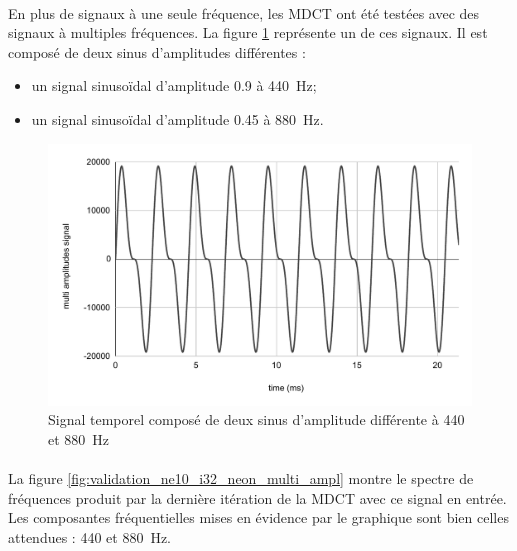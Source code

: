 \documentclass{article}
\begin{document}
    \paragraph{}
    En plus de signaux à une seule fréquence, les MDCT ont été testées avec des signaux à multiples fréquences. La figure \ref{fig:signal_multi_ampl} représente un de ces signaux. Il est composé de deux sinus d'amplitudes différentes :
    \begin{itemize}
        \item un signal sinusoïdal d'amplitude \SI{0.9}{} à \SI{440}{\hertz};
        \item un signal sinusoïdal d'amplitude \SI{0.45}{} à \SI{880}{\hertz}.
    \end{itemize}
    \begin{figure}[H]
        \centering
        \includegraphics[width=.8\linewidth]{./images/signal_multi_ampl.pdf}
        \caption{Signal temporel composé de deux sinus d'amplitude différente à \SI{440}{} et \SI{880}{\hertz}}
        \label{fig:signal_multi_ampl}
    \end{figure}
    
    \paragraph{}
    La figure \ref{fig:validation_ne10_i32_neon_multi_ampl} montre le spectre de fréquences produit par la dernière itération de la MDCT avec ce signal en entrée. Les composantes fréquentielles mises en évidence par le graphique sont bien celles attendues : \SI{440}{} et \SI{880}{\hertz}.
\end{document}
